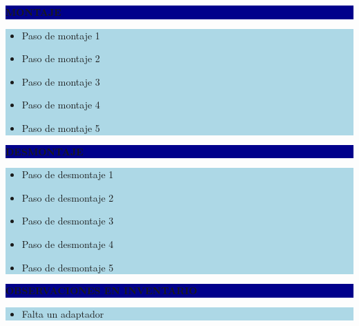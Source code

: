 \documentclass[11pt]{article}
\newcommand{\seccionbanda}[1]{%
  \vspace{0.6em}
  \noindent\colorbox{darkblue}{\parbox{\dimexpr\linewidth-2\fboxsep}{%
    \centering\color{white}\bfseries #1}}\par\vspace{0.6em}
}
\begin{document}
\seccionbanda{MONTAJE}
\noindent\colorbox{lightblue}{\parbox{\dimexpr\linewidth-2\fboxsep\relax}{%
\begin{itemize}[label=$\square$, itemsep=4pt]
\item Paso de montaje 1
\item Paso de montaje 2
\item Paso de montaje 3
\item Paso de montaje 4
\item Paso de montaje 5
\end{itemize}
}}\par

\seccionbanda{DESMONTAJE}
\noindent\colorbox{lightblue}{\parbox{\dimexpr\linewidth-2\fboxsep\relax}{%
\begin{itemize}[label=$\square$, itemsep=4pt]
\item Paso de desmontaje 1
\item Paso de desmontaje 2
\item Paso de desmontaje 3
\item Paso de desmontaje 4
\item Paso de desmontaje 5
\end{itemize}
}}\par
\seccionbanda{OBSERVACIONES EN INVENTARIO}
\noindent\colorbox{lightblue}{\parbox{\dimexpr\linewidth-2\fboxsep\relax}{\begin{itemize}[itemsep=4pt]
\item Falta un adaptador
\end{itemize}}}\par
\end{document}
